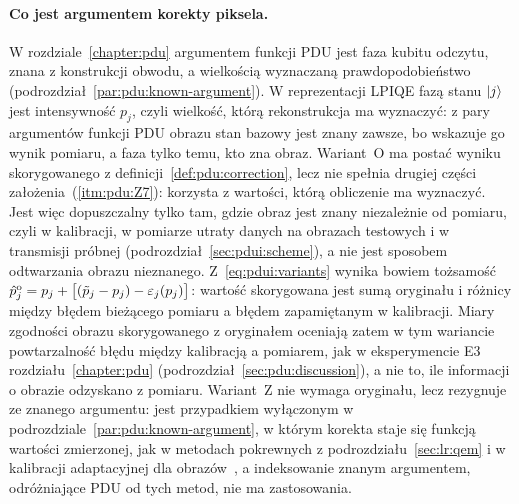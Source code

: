 \paragraph{Co jest argumentem korekty piksela.}\label{par:pdui:argument}
W rozdziale~\ref{chapter:pdu} argumentem funkcji PDU jest faza kubitu odczytu, znana z konstrukcji obwodu, a wielkością wyznaczaną prawdopodobieństwo (podrozdział~\ref{par:pdu:known-argument}).
W reprezentacji LPIQE fazą stanu $\ket{j}$ jest intensywność $p_j$, czyli wielkość, którą rekonstrukcja ma wyznaczyć: z pary argumentów funkcji PDU obrazu stan bazowy jest znany zawsze, bo wskazuje go wynik pomiaru, a faza tylko temu, kto zna obraz.
Wariant~O ma postać wyniku skorygowanego z definicji~\ref{def:pdu:correction}, lecz nie spełnia drugiej części założenia~(\ref{itm:pdu:Z7}): korzysta z wartości, którą obliczenie ma wyznaczyć.
Jest więc dopuszczalny tylko tam, gdzie obraz jest znany niezależnie od pomiaru, czyli w kalibracji, w pomiarze utraty danych na obrazach testowych i w transmisji próbnej (podrozdział~\ref{sec:pdui:scheme}), a nie jest sposobem odtwarzania obrazu nieznanego.
Z~\eqref{eq:pdui:variants} wynika bowiem tożsamość $\hat{p}^{\mathrm{o}}_j=p_j+\bigl[(\tilde{p}_j-p_j)-\varepsilon_j(p_j)\bigr]$: wartość skorygowana jest sumą oryginału i różnicy między błędem bieżącego pomiaru a błędem zapamiętanym w kalibracji.
Miary zgodności obrazu skorygowanego z oryginałem oceniają zatem w tym wariancie powtarzalność błędu między kalibracją a pomiarem, jak w eksperymencie E3 rozdziału~\ref{chapter:pdu} (podrozdział~\ref{sec:pdu:discussion}), a nie to, ile informacji o obrazie odzyskano z pomiaru.
Wariant~Z nie wymaga oryginału, lecz rezygnuje ze znanego argumentu: jest przypadkiem wyłączonym w podrozdziale~\ref{par:pdu:known-argument}, w którym korekta staje się funkcją wartości zmierzonej, jak w metodach pokrewnych z podrozdziału~\ref{sec:lr:qem} i w kalibracji adaptacyjnej dla obrazów~\cite{balewski_quantum-parallel_2024}, a indeksowanie znanym argumentem, odróżniające PDU od tych metod, nie ma zastosowania.

